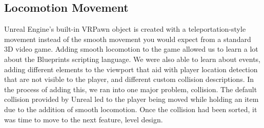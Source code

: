 \documentclass{sigchi}
\begin{document}
\subsection*{Locomotion Movement}
Unreal Engine’s built-in VRPawn object is created with a teleportation-style movement instead of the smooth movement you would expect from a standard 3D video game. Adding smooth locomotion to the game allowed us to learn a lot about the Blueprints scripting language. We were also able to learn about events, adding different elements to the viewport that aid with player location detection that are not visible to the player, and different custom collision descriptions. In the process of adding this, we ran into one major problem, collision. The default collision provided by Unreal led to the player being moved while holding an item due to the addition of smooth locomotion. Once the collision had been sorted, it was time to move to the next feature, level design. 
\end{document}
